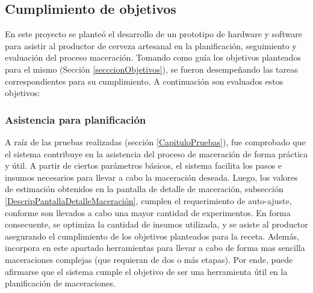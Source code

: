 \subsection{Cumplimiento de objetivos}

\par En este proyecto se planteó el desarrollo de un prototipo de hardware y software para asistir al productor de cerveza artesanal en la planificación, seguimiento y evaluación del proceso maceración. Tomando como guía los objetivos planteados para el mismo (Sección \ref{secccionObjetivos}), se fueron desempeñando las tareas correspondientes para su cumplimiento. A continuación son evaluados estos objetivos:

\subsubsection{Asistencia para planificación} 
\par A raíz de las pruebas realizadas (sección \ref{CapituloPruebas}), fue comprobado que el sistema contribuye en la asistencia del proceso de maceración de forma práctica y útil. A partir de ciertos parámetros básicos, el sistema facilita los pasos e insumos necesarios para llevar a cabo la maceración deseada. Luego, los valores de estimación obtenidos en la pantalla de detalle de maceración, subsección \ref{DescripPantallaDetalleMaceración}, cumplen el requerimiento de auto-ajuste, conforme son llevados a cabo una mayor cantidad de experimentos. En forma consecuente, se optimiza la cantidad de insumos utilizada, y se asiste al productor asegurando el cumplimiento de los objetivos planteados para la receta. Además, incorpora en este apartado herramientas para llevar a cabo de forma mas sencilla maceraciones complejas (que requieran de dos o más etapas). Por ende, puede afirmarse que el sistema cumple el objetivo de ser una herramienta útil en la planificación de maceraciones.

